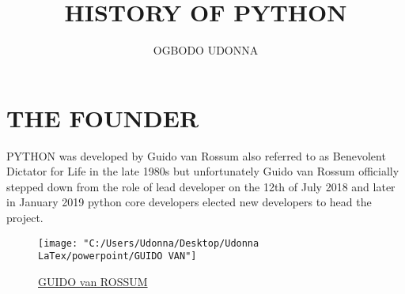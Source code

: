 \documentclass{article}
\title{HISTORY OF PYTHON}
\author{OGBODO UDONNA}
\begin{document}
\section{THE FOUNDER}
PYTHON was developed by Guido van Rossum also referred to as Benevolent Dictator for Life in the late 1980s but unfortunately Guido van Rossum officially stepped down from the role of lead developer on the 12th of July 2018 and later in January 2019 python core developers elected new developers to head the project.
\begin{figure}
	\texttt{[image: "C:/Users/Udonna/Desktop/Udonna LaTex/powerpoint/GUIDO VAN"]}
	\caption{\underline{GUIDO van ROSSUM}}
	\label{fig:guido-van}
\end{figure}
\end{document}
